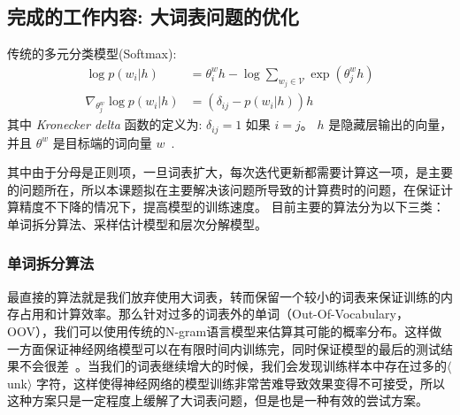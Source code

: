\documentclass[twoside,UTF8,AutoFakeBold]{buaathesis}
\begin{document}
\subsection{完成的工作内容: 大词表问题的优化}
传统的多元分类模型(Softmax):
\begin{equation}
\label{eq:softmax}
\begin{split}
\log p(w_i|h) &= \theta^w_i h-\log \sum_{w_j\in \mathcal{V}}{\exp(\theta^w_j h)}\\
\nabla_{\theta^w_j}{\log p(w_i|h)}&= (\delta_{ij}-p(w_i|h))h
\end{split}
\end{equation}
其中 \textit{Kronecker delta} 函数的定义为: $\delta_{ij} = 1$ 如果 $i = j$。 $h$ 是隐藏层输出的向量，并且 $\theta^w$ 是目标端的词向量 $w$~\cite{duda2012pattern}.

其中由于分母是正则项，一旦词表扩大，每次迭代更新都需要计算这一项，是主要的问题所在，所以本课题拟在主要解决该问题所导致的计算费时的问题，在保证计算精度不下降的情况下，提高模型的训练速度。 目前主要的算法分为以下三类： 单词拆分算法、采样估计模型和层次分解模型。


\subsubsection{单词拆分算法}
最直接的算法就是我们放弃使用大词表，转而保留一个较小的词表来保证训练的内存占用和计算效率。那么针对过多的词表外的单词（Out-Of-Vocabulary，OOV），我们可以使用传统的N-gram语言模型来估算其可能的概率分布。这样做一方面保证神经网络模型可以在有限时间内训练完，同时保证模型的最后的测试结果不会很差~\cite{DBLP:journals/csl/Schwenk07}。当我们的词表继续增大的时候，我们会发现训练样本中存在过多的$\langle$unk$\rangle$ 字符，这样使得神经网络的模型训练非常苦难导致效果变得不可接受，所以这种方案只是一定程度上缓解了大词表问题，但是也是一种有效的尝试方案。
\end{document}
